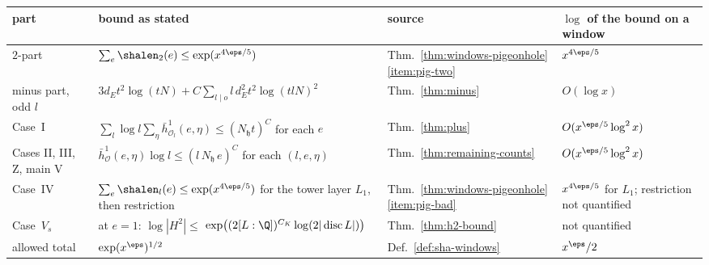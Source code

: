 {\footnotesize
\setlength{\tabcolsep}{4pt}%
\renewcommand{\arraystretch}{1.15}%
\begin{tabular}{@{}>{\raggedright\arraybackslash}p{1.75cm}
  >{\raggedright\arraybackslash}p{5.3cm}
  >{\raggedright\arraybackslash}p{2.1cm}
  >{\raggedright\arraybackslash}p{2.5cm}@{}}
\toprule
part & bound as stated & source & $\log$ of the bound on a window\\
\midrule
$2$-part & $\sum_{e}\shalen_2(e)\le\exp(x^{4\eps/5})$
  & Thm.~\ref{thm:windows-pigeonhole}\ref{item:pig-two}
  & $x^{4\eps/5}$\\
minus part, odd $l$ & $3d_Et^2\log(tN)+C\sum_{l\mid o}l\,d_E^2t^2\log(tlN)^2$
  & Thm.~\ref{thm:minus} & $O(\log x)$\\
Case~I & $\sum_l\log l\sum_\eta\bar h^1_{\mathcal O_l}(e,\eta)\le(N_{\mathfrak h}t)^C$ for each $e$
  & Thm.~\ref{thm:plus} & $O(x^{\eps/5}\log^2x)$\\
Cases II, III, Z, main V & $\bar h^1_{\mathcal O}(e,\eta)\log l\le(l\,N_{\mathfrak h}\,e)^C$ for each $(l,e,\eta)$
  & Thm.~\ref{thm:remaining-counts} & $O(x^{\eps/5}\log^2x)$\\
Case~IV & $\sum_e\shalen_l(e)\le\exp(x^{4\eps/5})$ for the tower
  layer $L_1$, then restriction
  & Thm.~\ref{thm:windows-pigeonhole}\ref{item:pig-bad}
  & $x^{4\eps/5}$ for $L_1$; restriction not quantified\\
Case~$V_s$ & at $e=1$: $\log|H^2|\le{}$\newline
  $\exp\bigl((2[L:\Q])^{C_K}\log(2|\operatorname{disc}L|)\bigr)$ & Thm.~\ref{thm:h2-bound} & not quantified\\
\midrule
allowed total & $\exp(x^\eps)^{1/2}$ & Def.~\ref{def:sha-windows}
  & $x^\eps/2$\\
\bottomrule
\end{tabular}}
\caption{The pieces of the Sha budget of a $\psi$-field $E$ in the proof
of Theorem~\ref{thm:sha-windows}, for $x$ in a window. There
$t=\lfloor x^{401}\rfloor$, $[E:\Q]=d_E$ is about $x^{2+8\eps}$ and
$\log N_{\mathfrak h}=O(x^{\eps/5}\log^2x)$, so the polynomial bounds
have logarithm $O(x^{\eps/5}\log^2x)$ or less, against $x^\eps/2$ for the
budget. The sums over $e<t$, over $\eta$ and, in Cases II, III, Z and main~V,
over $l<2t$ or $l\in B_\psi$ (proof of
Proposition~\ref{prop:cases-exhaustive}) multiply by
factors polynomial in $t$ and $N_{\mathfrak h}$. The text does not state
the size of the Case~$V_s$ contribution or of the restriction step in
Case~IV on a window.}
\label{fig:sha-ledger}
